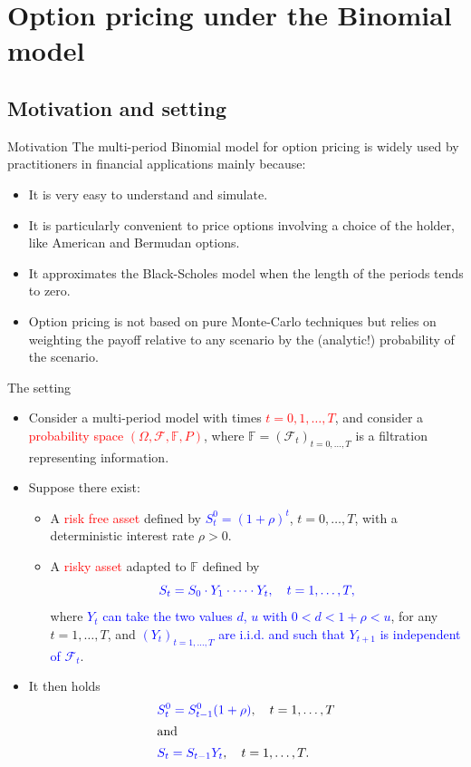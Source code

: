 \documentclass[9 pt]{beamer} %
\def \blue {\textcolor{blue}}
\def \red {\textcolor{red}}
\def \F {\mathcal{F}}
\def \bF {\mathbb{F}}
\def \O {\Omega}
\begin{document}
\section{Option pricing under the Binomial model}
\frame{  \tableofcontents[
    sectionstyle=show/shaded,
    subsectionstyle=show/shaded/shaded,
    subsubsectionstyle=show/shaded/shaded/shaded
    ]}

\subsection{Motivation and setting}
\frame{  \tableofcontents[
    sectionstyle=show/shaded,
    subsectionstyle=show/shaded/shaded,
    subsubsectionstyle=show/shaded/shaded/shaded
    ]}
    
\begin{frame}{Motivation}
The multi-period Binomial model for option pricing is widely used by practitioners in financial applications mainly because:
\begin{itemize}
\item It is very easy to understand and simulate.
\item It is particularly convenient to price options involving a choice of the holder, like American and Bermudan options.
\item It approximates the Black-Scholes model when the length of the periods tends to zero.
\item Option pricing is not based on pure Monte-Carlo techniques but relies on weighting the payoff relative to any scenario by the (analytic!) probability of the scenario.
\end{itemize}
\end{frame}

\begin{frame}{The setting}
\begin{itemize}
 \item Consider a multi-period model with times \red{$t=0,1,\dots,T$}, and consider a \red{probability space $(\O,\F,\bF,P)$}, where $\bF=(\F_t)_{t=0,\dots,T}$ is a filtration representing information.
 \item Suppose there exist:
\begin{itemize}
\item A \red{risk free asset} defined by \blue{$S_t^0 = (1+\rho)^t$}, $t=0,\dots,T$, with a deterministic interest rate $\rho>0$.
\item A \red{risky asset} adapted to $\bF$ defined by 
$$
\blue{S_t=S_0\cdot Y_1 \cdot \dots \cdot Y_t, \quad t=1,\dots,T,}
$$
where \blue{$Y_t$ can take the two values $d$, $u$ with $0<d<1+\rho<u$}, for any $t=1,\dots,T$, and \blue{$(Y_t)_{t=1,\dots,T}$ are i.i.d. and such that $Y_{t+1}$ is independent of $\F_t$}.
\end{itemize}
\item It then holds
\begin{align}
&\blue{S_t^0=S^0_{t-1}(1+\rho)}, \quad t=1,\dots,T\notag \\
\intertext{and}
&\blue{S_t=S_{t-1}Y_t}, \quad t=1,\dots,T.\notag
\end{align}
\end{itemize}
\end{frame}
\end{document}
